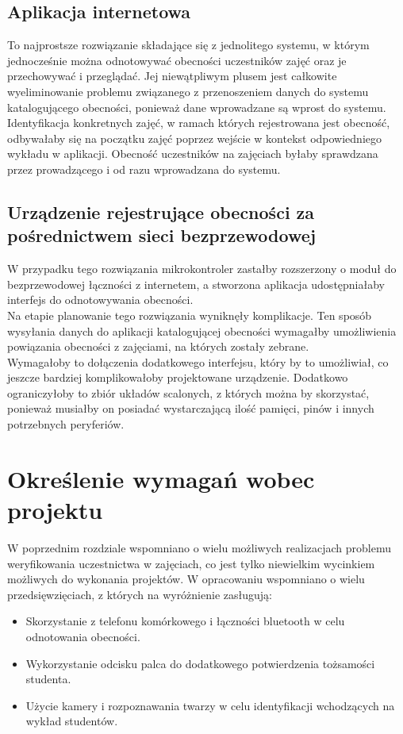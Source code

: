 \documentclass[declaration,shortabstract, mgr]{iithesis}
\begin{document}
\subsection{Aplikacja internetowa}
\indent To najprostsze rozwiązanie składające się z jednolitego systemu, w którym jednocześnie można odnotowywać obecności uczestników zajęć oraz je przechowywać i przeglądać. Jej niewątpliwym plusem jest całkowite wyeliminowanie problemu związanego z przenoszeniem danych do systemu katalogującego obecności, ponieważ dane wprowadzane są wprost do systemu. Identyfikacja konkretnych zajęć, w ramach których rejestrowana jest obecność, odbywałaby się na początku zajęć poprzez wejście w kontekst odpowiedniego wykładu w aplikacji. Obecność uczestników na zajęciach byłaby sprawdzana przez prowadzącego i od razu wprowadzana do systemu. \\

\subsection{Urządzenie rejestrujące obecności za pośrednictwem sieci bezprzewodowej}
\indent W przypadku tego rozwiązania mikrokontroler zastałby rozszerzony o moduł do bezprzewodowej łączności z internetem, a stworzona aplikacja udostępniałaby interfejs do odnotowywania obecności. \\
\indent Na etapie planowanie tego rozwiązania wyniknęły komplikacje. Ten sposób wysyłania danych do aplikacji katalogującej obecności wymagałby umożliwienia powiązania obecności z zajęciami, na których zostały zebrane. \\
\indent Wymagałoby to dołączenia dodatkowego interfejsu, który by to umożliwiał, co jeszcze bardziej komplikowałoby projektowane urządzenie. Dodatkowo ograniczyłoby to zbiór układów scalonych, z których można by skorzystać, ponieważ musiałby on posiadać wystarczającą ilość pamięci, pinów i innych potrzebnych peryferiów.

\section{Określenie wymagań wobec projektu}
\indent W poprzednim rozdziale wspomniano o wielu możliwych realizacjach problemu weryfikowania uczestnictwa w zajęciach, co jest tylko niewielkim wycinkiem możliwych do wykonania projektów. W opracowaniu \cite{review} wspomniano o wielu przedsięwzięciach, z których na wyróżnienie zasługują:

\begin{itemize}
\item Skorzystanie z telefonu komórkowego i łączności bluetooth w celu odnotowania obecności.
\item Wykorzystanie odcisku palca do dodatkowego potwierdzenia tożsamości studenta.
\item Użycie kamery i rozpoznawania twarzy w celu identyfikacji wchodzących na wykład studentów.
\end{itemize}
\end{document}
